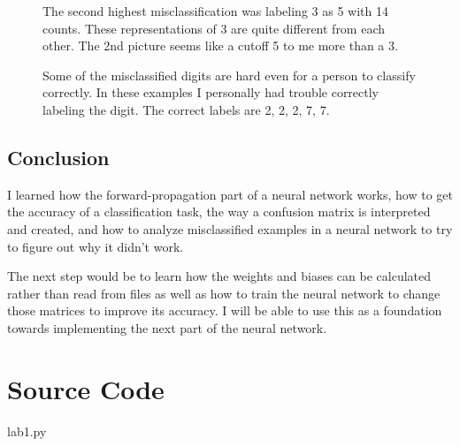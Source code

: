 \documentclass[12pt,letterpaper]{report}
\begin{document}
    \begin{figure}[H]
   	\centering
    \caption{The second highest misclassification was labeling 3 as 5 with 14 counts. These representations of 3 are quite different from each other. The 2nd picture seems like a cutoff 5 to me more than a 3.}
    \end{figure}
    
    \begin{figure}[H]
   	\centering
    \caption{Some of the misclassified digits are hard even for a person to classify correctly. In these examples I personally had trouble correctly labeling the digit. The correct labels are 2, 2, 2, 7, 7.}
    \end{figure}
    
    \FloatBarrier
    \section{Conclusion}
    I learned how the forward-propagation part of a neural network works, how to get the accuracy of a classification task, the way a confusion matrix is interpreted and created, and how to analyze misclassified examples in a neural network to try to figure out why it didn't work.
    
    The next step would be to learn how the weights and biases can be calculated rather than read from files as well as how to train the neural network to change those matrices to improve its accuracy. I will be able to use this as a foundation towards implementing the next part of the neural network.
	\appendix
	\chapter{Source Code}
    \vspace*{-10mm}
    	
                        {lab1.py}
	\newpage
\end{document}
